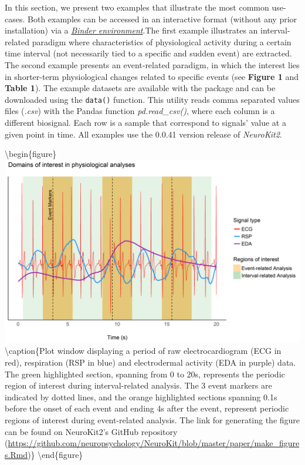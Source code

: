 \documentclass[
  english,
  man,floatsintext]{apa6}
\begin{document}
In this section, we present two examples that illustrate the most common use-cases. Both examples can be accessed in an interactive format (without any prior installation) via a \emph{\href{https://mybinder.org/v2/gh/neuropsychology/NeuroKit/master?urlpath=lab\%2Ftree\%2Fdocs\%2Fexamples}{Binder environment}}.The first example illustrates an interval-related paradigm where characteristics of physiological activity during a certain time interval (not necessarily tied to a specific and sudden event) are extracted. The second example presents an event-related paradigm, in which the interest lies in shorter-term physiological changes related to specific events (see \textbf{Figure 1} and \textbf{Table 1}). The example datasets are available with the package and can be downloaded using the \texttt{data()} function. This utility reads comma separated values files (\emph{.csv}) with the Pandas function \emph{pd.read\_csv()}, where each column is a different biosignal. Each row is a sample that correspond to signals' value at a given point in time. All examples use the 0.0.41 version release of \emph{NeuroKit2}.

\textbackslash begin\{figure\}
\includegraphics[width=1\linewidth]{figures/features} \textbackslash caption\{Plot window displaying a period of raw electrocardiogram (ECG in red), respiration (RSP in blue) and electrodermal activity (EDA in purple) data. The green highlighted section, spanning from 0 to 20s, represents the periodic region of interest during interval-related analysis. The 3 event markers are indicated by dotted lines, and the orange highlighted sections spanning 0.1s before the onset of each event and ending 4s after the event, represent periodic regions of interest during event-related analysis. The link for generating the figure can be found on NeuroKit2's GitHub repository (\url{https://github.com/neuropsychology/NeuroKit/blob/master/paper/make_figures.Rmd})\}\label{fig:unnamed-chunk-2}
\textbackslash end\{figure\}
\end{document}
